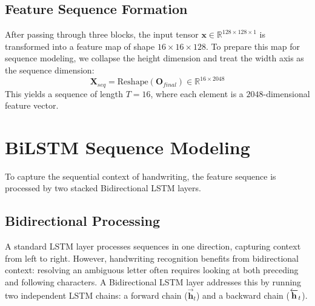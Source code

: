 \subsection{Feature Sequence Formation}
After passing through three blocks, the input tensor $\mathbf{x} \in \mathbb{R}^{128 \times 128 \times 1}$ is transformed into a feature map of shape $16 \times 16 \times 128$. To prepare this map for sequence modeling, we collapse the height dimension and treat the width axis as the sequence dimension:
\begin{equation}
    \mathbf{X}_{seq} = \text{Reshape}(\mathbf{O}_{final}) \in \mathbb{R}^{16 \times 2048}
\end{equation}
This yields a sequence of length $T = 16$, where each element is a $2048$-dimensional feature vector.

\section{BiLSTM Sequence Modeling}
To capture the sequential context of handwriting, the feature sequence is processed by two stacked Bidirectional LSTM layers.

\subsection{Bidirectional Processing}
A standard LSTM layer processes sequences in one direction, capturing context from left to right. However, handwriting recognition benefits from bidirectional context: resolving an ambiguous letter often requires looking at both preceding and following characters. A Bidirectional LSTM layer addresses this by running two independent LSTM chains: a forward chain ($\vec{\mathbf{h}}_t$) and a backward chain ($\protect\overleftarrow{\mathbf{h}}_t$).

